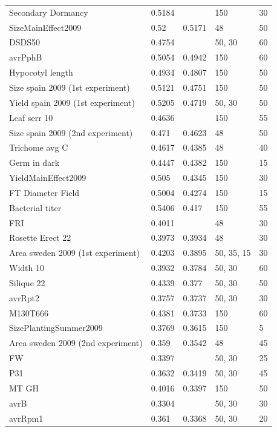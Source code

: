 \begin{longtable}{p{} p{} p{} p{} p{}}
  Secondary Dormancy & 0.5184 & \color{red}{0.5264} & 150 & 30 \\
  SizeMainEffect2009 & 0.52 & 0.5171 & 48 & 50 \\
  DSDS50 & 0.4754 & \color{red}{0.5006} & 50, 30 & 60 \\
  avrPphB & 0.5054 & 0.4942 & 150 & 60 \\
  Hypocotyl length & 0.4934 & 0.4807 & 150 & 50 \\
  Size spain 2009 (1st experiment) & 0.5121 & 0.4751 & 150 & 50 \\
  Yield spain 2009 (1st experiment) & 0.5205 & 0.4719 & 50, 30 & 50 \\
  Leaf serr 10 & 0.4636 & \color{red}{0.4683} & 150 & 55 \\
  Size spain 2009 (2nd experiment) & 0.471 & 0.4623 & 48 & 50 \\
  Trichome avg C & 0.4617 & 0.4385 & 48 & 40 \\
  Germ in dark & 0.4447 & 0.4382 & 150 & 15 \\
  YieldMainEffect2009 & 0.505 & 0.4345 & 150 & 30 \\
  FT Diameter Field & 0.5004 & 0.4274 & 150 & 15 \\
  Bacterial titer & 0.5406 & 0.417 & 150 & 55 \\
  FRI & 0.4011 & \color{red}{0.4119} & 48 & 30 \\
  Rosette Erect 22 & 0.3973 & 0.3934 & 48 & 30 \\
  Area sweden 2009 (1st experiment) & 0.4203 & 0.3895 & 50, 35, 15 & 30 \\
  Width 10 & 0.3932 & 0.3784 & 50, 30 & 60 \\
  Silique 22 & 0.4339 & 0.377 & 50, 30 & 50 \\
  avrRpt2 & 0.3757 & 0.3737 & 50, 30 & 30 \\
  M130T666 & 0.4381 & 0.3733 & 150 & 60 \\
  SizePlantingSummer2009 & 0.3769 & 0.3615 & 150 & 5 \\
  Area sweden 2009 (2nd experiment) & 0.359 & 0.3542 & 48 & 45 \\
  FW  & 0.3397 & \color{red}{0.3522} & 50, 30 & 25 \\
  P31 & 0.3632 & 0.3419 & 50, 30 & 45 \\
  MT GH & 0.4016 & 0.3397 & 150 & 50 \\
  avrB & 0.3304 & \color{red}{0.3384} & 50, 30 & 30 \\
  avrRpm1 & 0.361 & 0.3368 & 50, 30 & 20 \\

\end{longtable}
